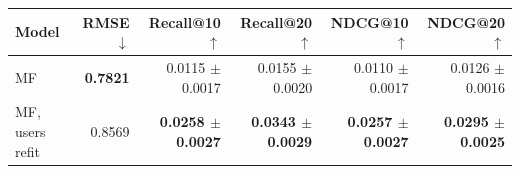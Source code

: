 \begin{tabular}{lrrrrr}
\toprule
Model & RMSE $\downarrow$ & Recall@10 $\uparrow$ & Recall@20 $\uparrow$ & NDCG@10 $\uparrow$ & NDCG@20 $\uparrow$ \\
\midrule
MF & \textbf{0.7821} & 0.0115 $\pm$ 0.0017 & 0.0155 $\pm$ 0.0020 & 0.0110 $\pm$ 0.0017 & 0.0126 $\pm$ 0.0016 \\
MF, users refit & 0.8569 & \textbf{0.0258 $\pm$ 0.0027} & \textbf{0.0343 $\pm$ 0.0029} & \textbf{0.0257 $\pm$ 0.0027} & \textbf{0.0295 $\pm$ 0.0025} \\
\bottomrule
\end{tabular}
